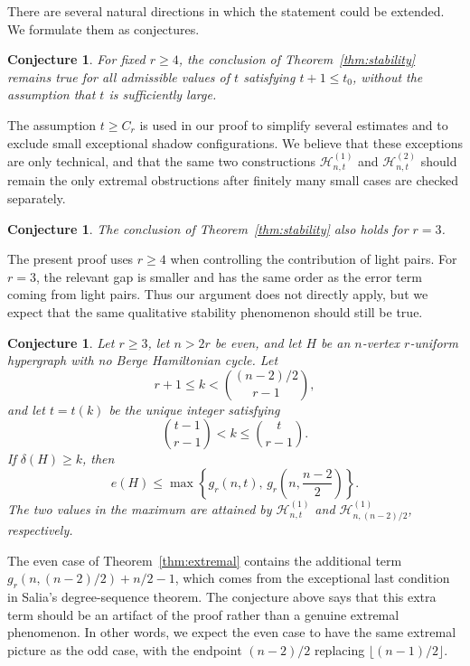 \documentclass[12pt]{article}
\newtheorem{conjecture}[theorem]{Conjecture}
\begin{document}
There are several natural directions in which the statement could be extended.
We formulate them as conjectures.

\begin{conjecture}
For fixed $r \ge 4$, the conclusion of
Theorem~\ref{thm:stability} remains true for all admissible values of $t$
satisfying $t+1\le t_0$, without the assumption that $t$ is sufficiently
large.
\end{conjecture}

The assumption $t \ge C_r$ is used in our proof to simplify several estimates
and to exclude small exceptional shadow configurations. We believe that these
exceptions are only technical, and that the same two constructions
$\mathcal{H}^{(1)}_{n,t}$ and
$\mathcal{H}^{(2)}_{n,t}$ should remain the only extremal obstructions
after finitely many small cases are checked separately.

\begin{conjecture}
The conclusion of Theorem~\ref{thm:stability} also holds for $r=3$.
\end{conjecture}

The present proof uses $r \ge 4$ when controlling the contribution of light
pairs. For $r=3$, the relevant gap is smaller and has the same order as the
error term coming from light pairs. Thus our argument does not directly apply,
but we expect that the same qualitative stability phenomenon should still be
true.

\begin{conjecture}
Let $r \ge 3$, let $n > 2r$ be even, and let $H$ be an $n$-vertex
$r$-uniform hypergraph with no Berge Hamiltonian cycle. Let
\[
r+1 \le k < \binom{(n-2)/2}{r-1},
\]
and let $t=t(k)$ be the unique integer satisfying
\[
\binom{t-1}{r-1} < k \le \binom{t}{r-1}.
\]
If $\delta(H) \ge k$, then
\[
e(H) \le
\max \left\{
g_r(n,t),\,
g_r\left(n,\frac{n-2}{2}\right)
\right\}.
\]
The two values in the maximum are attained by
$\mathcal{H}^{(1)}_{n,t}$ and
$\mathcal{H}^{(1)}_{n,(n-2)/2}$, respectively.
\end{conjecture}


The even case of Theorem~\ref{thm:extremal} contains the additional term
$g_r(n,(n-2)/2)+n/2-1$, which comes from the exceptional last condition in
Salia's degree-sequence theorem. The conjecture above says that this extra
term should be an artifact of the proof rather than a genuine extremal
phenomenon. In other words, we expect the even case to have the same extremal
picture as the odd case, with the endpoint $(n-2)/2$ replacing
$\lfloor (n-1)/2 \rfloor$.
\end{document}
